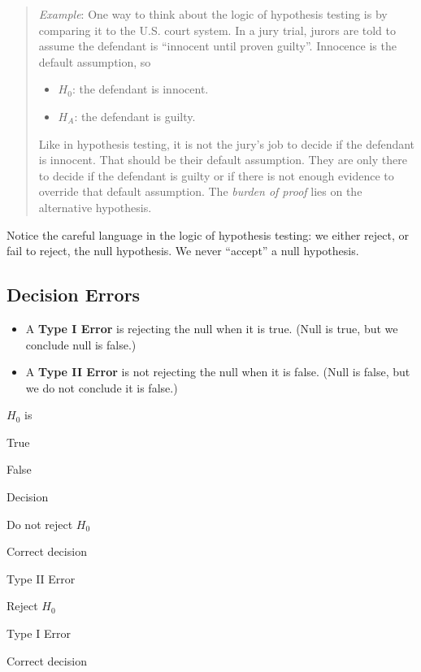 \documentclass[
]{book}
\providecommand{\tightlist}{%
  \setlength{\itemsep}{0pt}\setlength{\parskip}{0pt}}
\begin{document}
\begin{quote}
\emph{Example}: One way to think about the logic of hypothesis testing is by comparing it to the U.S. court system. In a jury trial, jurors are told to assume the defendant is ``innocent until proven guilty''. Innocence is the default assumption, so

\begin{itemize}
\tightlist
\item
  \(H_0\): the defendant is innocent.
\item
  \(H_A\): the defendant is guilty.
\end{itemize}

Like in hypothesis testing, it is not the jury's job to decide if the defendant is innocent. That should be their default assumption. They are only there to decide if the defendant is guilty or if there is not enough evidence to override that default assumption. The \emph{burden of proof} lies on the alternative hypothesis.
\end{quote}

Notice the careful language in the logic of hypothesis testing: we either reject, or fail to reject, the null hypothesis. We never ``accept'' a null hypothesis.

\hypertarget{decision-errors}{%
\subsection{Decision Errors}\label{decision-errors}}

\begin{itemize}
\tightlist
\item
  A \textbf{Type I Error} is rejecting the null when it is true. (Null is true, but we conclude null is false.)
\item
  A \textbf{Type II Error} is not rejecting the null when it is false. (Null is false, but we do not conclude it is false.)
\end{itemize}

\(H_0\) is

True

False

Decision

Do not reject \(H_0\)

Correct decision

Type II Error

Reject \(H_0\)

Type I Error

Correct decision
\end{document}
